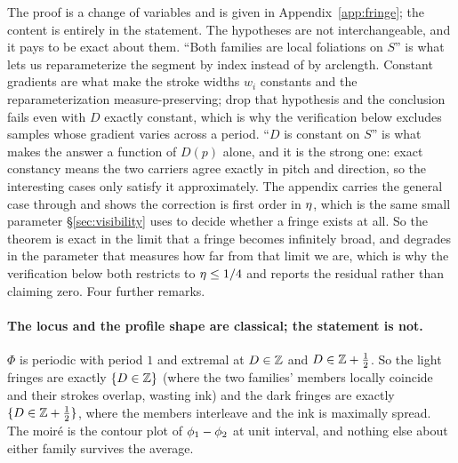 The proof is a change of variables and is given in Appendix~\ref{app:fringe}; the
content is entirely in the statement. The hypotheses are not interchangeable,
and it pays to be exact about them. ``Both families are local foliations on
$S$'' is what lets us reparameterize the segment by index instead of by
arclength. Constant gradients are what make the stroke widths $w_i$ constants
and the reparameterization measure-preserving; drop that hypothesis and the
conclusion fails even with $D$ exactly constant, which is why the verification
below excludes samples whose gradient varies across a period. ``$D$ is constant
on $S$'' is what makes the answer a function of $D(p)$ alone, and it is the
strong one: exact constancy means the two carriers agree exactly in pitch and
direction, so the interesting cases only satisfy it approximately. The appendix
carries the general case through and shows the correction is first order in
$\eta$, which is the same small parameter \S\ref{sec:visibility} uses to decide
whether a fringe exists at all. So the theorem is exact in the limit that a
fringe becomes infinitely broad, and degrades in the parameter that measures how
far from that limit we are, which is why the verification below both
restricts to $\eta\le1/4$ and reports the residual rather than claiming zero.
Four further remarks.

\paragraph{The locus and the profile shape are classical; the statement is not.}
$\Phi$ is periodic with period $1$ and extremal at $D\in\mathbb{Z}$ and
$D\in\mathbb{Z}+\tfrac12$. So the light fringes are exactly $\{D\in\mathbb{Z}\}$ (where the two
families' members locally coincide and their strokes overlap, wasting ink) and
the dark fringes are exactly $\{D\in\mathbb{Z}+\tfrac12\}$, where the members interleave
and the ink is maximally spread. The moir\'e is the contour plot of
$\phi_1-\phi_2$ at unit interval, and nothing else about either family survives
the average.

